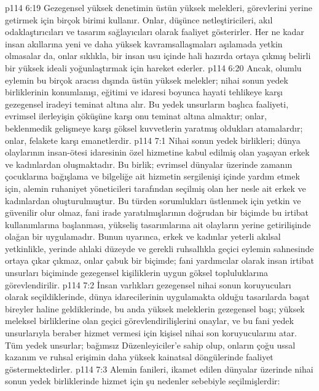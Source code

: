 \vs p114 6:19 Gezegensel yüksek denetimin üstün yüksek melekleri, görevlerini yerine getirmek için birçok birimi kullanır. Onlar, düşünce netleştiricileri, akıl odaklaştırıcıları ve tasarım sağlayıcıları olarak faaliyet gösterirler. Her ne kadar insan akıllarına yeni ve daha yüksek kavramsallaşmaları aşılamada yetkin olmasalar da, onlar sıklıkla, bir insan usu içinde hali hazırda ortaya çıkmış belirli bir yüksek ideali yoğunlaştırmak için hareket ederler.
\vs p114 6:20 Ancak, olumlu eylemin bu birçok aracısı dışında üstün yüksek melekler; nihai sonun yedek birliklerinin konumlanışı, eğitimi ve idaresi boyunca hayati tehlikeye karşı gezegensel iradeyi teminat altına alır. Bu yedek unsurların başlıca faaliyeti, evrimsel ilerleyişin çöküşüne karşı onu teminat altına almaktır; onlar, beklenmedik gelişmeye karşı göksel kuvvetlerin yaratmış oldukları atamalardır; onlar, felakete karşı emanetlerdir.
\vs p114 7:1 Nihai sonun yedek birlikleri; dünya olaylarının insan\hyp{}ötesi idaresinin özel hizmetine kabul edilmiş olan yaşayan erkek ve kadınlardan oluşmaktadır. Bu birlik; evrimsel dünyalar üzerinde zamanın çocuklarına bağışlama ve bilgeliğe ait hizmetin sergilenişi içinde yardım etmek için, alemin ruhaniyet yöneticileri tarafından seçilmiş olan her nesle ait erkek ve kadınlardan oluşturulmuştur. Bu türden sorumlukları üstlenmek için yetkin ve güvenilir olur olmaz, fani irade yaratılmışlarının doğrudan bir biçimde bu irtibat kullanımlarına başlanması, yükseliş tasarımlarına ait olayların yerine getirilişinde olağan bir uygulamadır. Bunun uyarınca, erkek ve kadınlar yeterli akılsal yetkinlikle, yerinde ahlaki düzeyde ve gerekli ruhsallıkla geçici eylemin sahnesinde ortaya çıkar çıkmaz, onlar çabuk bir biçimde; fani yardımcılar olarak insan irtibat unsurları biçiminde gezegensel kişiliklerin uygun göksel topluluklarına görevlendirilir.
\vs p114 7:2 İnsan varlıkları gezegensel nihai sonun koruyucuları olarak seçildiklerinde, dünya idarecilerinin uygulamakta olduğu tasarılarda başat bireyler haline geldiklerinde, bu anda yüksek meleklerin gezegensel başı; yüksek meleksel birliklerine olan geçici görevlendirilişlerini onaylar, ve bu fani yedek unsurlarıyla beraber hizmet vermesi için kişisel nihai son koruyucularını atar. Tüm yedek unsurlar; bağımsız Düzenleyiciler’e sahip olup, onların çoğu ussal kazanım ve ruhsal erişimin daha yüksek kainatsal döngülerinde faaliyet göstermektedirler.
\vs p114 7:3 Alemin fanileri, ikamet edilen dünyalar üzerinde nihai sonun yedek birliklerinde hizmet için şu nedenler sebebiyle seçilmişlerdir:
